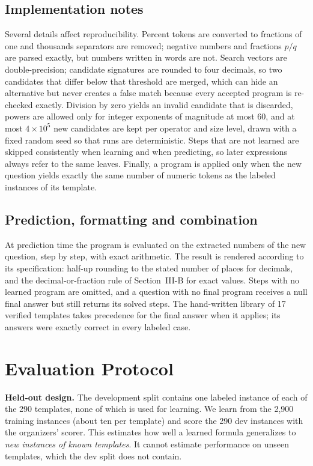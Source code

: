 \documentclass[conference]{IEEEtran}
\begin{document}
\subsection{Implementation notes}
Several details affect reproducibility. Percent tokens are converted to
fractions of one and thousands separators are removed; negative numbers and
fractions $p/q$ are parsed exactly, but numbers written in words are not.
Search vectors are double-precision; candidate signatures are rounded to four
decimals, so two candidates that differ below that threshold are merged, which
can hide an alternative but never creates a false match because every accepted
program is re-checked exactly. Division by zero yields an invalid candidate that
is discarded, powers are allowed only for integer exponents of magnitude at most
60, and at most $4\times10^{5}$ new candidates are kept per operator and size
level, drawn with a fixed random seed so that runs are deterministic. Steps that
are not learned are skipped consistently when learning and when predicting, so
later expressions always refer to the same leaves. Finally, a program is applied
only when the new question yields exactly the same number of numeric tokens as
the labeled instances of its template.

\subsection{Prediction, formatting and combination}
At prediction time the program is evaluated on the extracted numbers of the new
question, step by step, with exact arithmetic. The result is rendered according
to its specification: half-up rounding to the stated number of places for
decimals, and the decimal-or-fraction rule of Section~III-B for exact values.
Steps with no learned program are omitted, and a question with no final program
receives a null final answer but still returns its solved steps. The
hand-written library of 17 verified templates takes precedence for the final
answer when it applies; its answers were exactly correct in every labeled case.

\section{Evaluation Protocol}
\label{sec_protocol}
\textbf{Held-out design.} The development split contains one labeled instance of
each of the 290 templates, none of which is used for learning. We learn from the
2{,}900 training instances (about ten per template) and score the 290 dev
instances with the organizers' scorer. This estimates how well a learned formula
generalizes to \emph{new instances of known templates}. It cannot estimate
performance on unseen templates, which the dev split does not contain.
\end{document}
